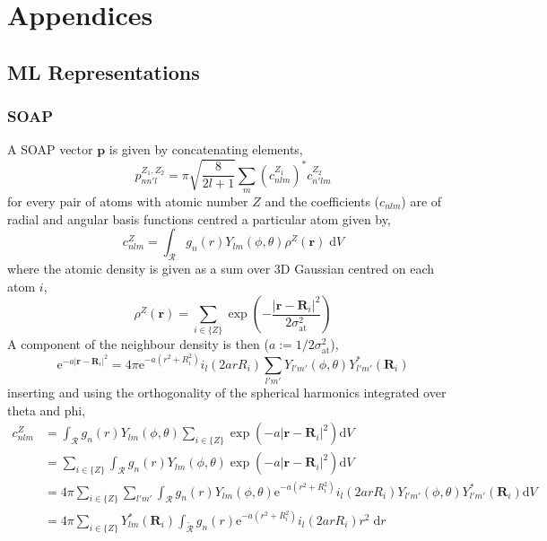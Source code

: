 \documentclass[../main.tex]{subfiles}
\begin{document}
\setcounter{footnote}{0} 

\chapter{Appendices}

\section{ML Representations}
\subsection{SOAP} \label{section::soap_derivation}

A SOAP vector\cite{Bartok2013} $\boldsymbol{p}$ is given by concatenating elements,
\begin{equation}
	p_{nn'l}^{Z_1, Z_2} = \pi \sqrt{\frac{8}{2l + 1}} \sum_m \left(c_{nlm}^{Z_1}\right)^* c_{n'lm}^{Z_2}
\end{equation}
for every pair of atoms with atomic number $Z$ and the coefficients ($c_{nlm}$) are of radial and angular basis functions centred a particular atom given by,
\begin{equation}
	c_{nlm}^Z = \int_\mathcal{R} g_n(r) Y_{lm}(\phi,\theta) \rho^Z(\boldsymbol{r})\; \text{d}V
\end{equation}
where the atomic density is given as a sum over 3D Gaussian centred on each atom $i$,
\begin{equation}
	\rho^Z(\boldsymbol{r}) = \sum_{i \in \{Z\}} \exp\left(-\frac{|\boldsymbol{r} - \boldsymbol{R}_i|^2}{2\sigma_\text{at}^2}\right)
\end{equation}
A component of the neighbour density is then ($a := 1/2\sigma_\text{at}^2$), 
\begin{equation}
	\text{e}^{-a|\boldsymbol{r} - \boldsymbol{R}_i|^2} = 4\pi \text{e}^{-a(r^2+R_i^2)}i_l(2arR_i) \sum_{l'm'}Y_{l'm'}(\phi, \theta) Y_{l'm'}^*(\boldsymbol{R}_i)
\end{equation}
inserting and using the orthogonality of the spherical harmonics integrated over theta and phi,
\begin{equation}
	\begin{split}
		c_{nlm}^Z &= \int_\mathcal{R} g_n(r) Y_{lm}(\phi,\theta)  \sum_{i \in \{Z\}} \exp\left(-a|\boldsymbol{r} - \boldsymbol{R}_i|^2\right) \text{d}V \\
		&= \sum_{i \in \{Z\}} \int_\mathcal{R} g_n(r) Y_{lm}(\phi,\theta) \exp\left(-a|\boldsymbol{r} - \boldsymbol{R}_i|^2\right) \text{d}V \\
		&=  4\pi \sum_{i \in \{Z\}}\sum_{l'm'} \int_\mathcal{R} g_n(r) Y_{lm}(\phi,\theta) \text{e}^{-a(r^2+R_i^2)}i_l(2arR_i)Y_{l'm'}(\phi, \theta) Y_{l'm'}^*(\boldsymbol{R}_i)  \text{d}V \\
		&=4\pi \sum_{i \in \{Z\}}Y_{lm}^*(\boldsymbol{R}_i) \int_\mathcal{\tilde{R}} g_n(r) \text{e}^{-a(r^2+R_i^2)}i_l(2arR_i)r^2\; \text{d}r
	\end{split}
\end{equation}
\end{document}
